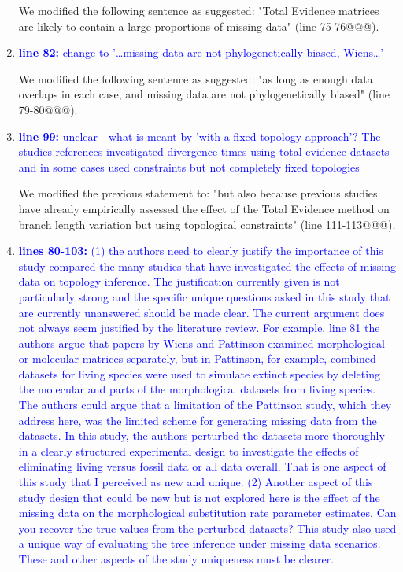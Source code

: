 \documentclass[12pt,letterpaper]{article}
\begin{document}
\begin{enumerate}
We modified the following sentence as suggested: "Total Evidence matrices are likely to contain a large proportions of missing data" (line 75-76@@@).

\item{\textcolor{blue}{\textbf{line 82:} change to '…missing data are not phylogenetically biased, Wiens…'}}

We modified the following sentence as suggested: "as long as enough data overlaps in each case, and missing data are not phylogenetically biased" (line 79-80@@@).

\item{\textcolor{blue}{\textbf{line 99:} unclear - what is meant by 'with a fixed topology approach'? The studies references investigated divergence times using total evidence datasets and in some cases used constraints but not completely fixed topologies}}

We modified the previous statement to: "but also because previous studies have already empirically assessed the effect of the Total Evidence method on branch length variation but using topological constraints" (line 111-113@@@).

\item{\textcolor{blue}{\textbf{lines 80-103:} (1) the authors need to clearly justify the importance of this study compared the many studies that have investigated the effects of missing data on topology inference.
The justification currently given is not particularly strong and the specific unique questions asked in this study that are currently unanswered should be made clear.
The current argument does not always seem justified by the literature review.
For example, line 81 the authors argue that papers by Wiens and Pattinson examined morphological or molecular matrices separately, but in Pattinson, for example, combined datasets for living species were used to simulate extinct species by deleting the molecular and parts of the morphological datasets from living species.
The authors could argue that a limitation of the Pattinson study, which they address here, was the limited scheme for generating missing data from the datasets.
In this study, the authors perturbed the datasets more thoroughly in a clearly structured experimental design to investigate the effects of eliminating living versus fossil data or all data overall.
That is one aspect of this study that I perceived as new and unique.
(2) Another aspect of this study design that could be new but is not explored here is the effect of the missing data on the morphological substitution rate parameter estimates.
Can you recover the true values from the perturbed datasets?
This study also used a unique way of evaluating the tree inference under missing data scenarios.
These and other aspects of the study uniqueness must be clearer.}}


\end{enumerate}
\end{document}
